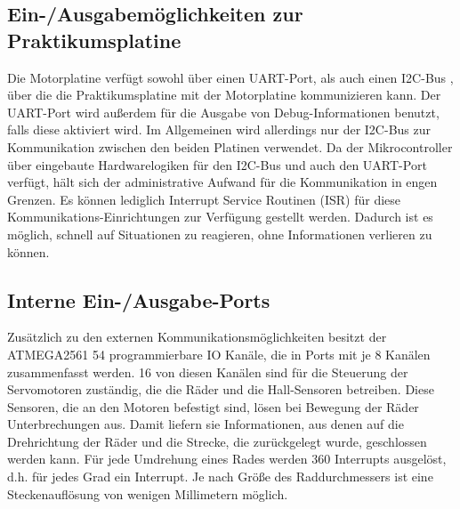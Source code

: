 \subsection{Ein-/Ausgabemöglichkeiten zur Praktikumsplatine}
Die Motorplatine verfügt sowohl über einen UART-Port, als auch einen I2C-Bus \cite{I2C_WIKI}, über die
die Praktikumsplatine mit der Motorplatine kommunizieren kann. Der UART-Port wird außerdem
für die Ausgabe von Debug-Informationen benutzt, falls diese aktiviert wird. Im Allgemeinen
wird allerdings nur der I2C-Bus zur Kommunikation zwischen den beiden Platinen verwendet.
Da der Mikrocontroller über eingebaute Hardwarelogiken für den I2C-Bus und auch
den UART-Port verfügt, hält sich der administrative Aufwand für die Kommunikation in engen
Grenzen. Es können lediglich Interrupt Service Routinen (ISR) für diese Kommunikations-Einrichtungen zur Verfügung gestellt
werden. Dadurch ist es möglich, schnell auf Situationen zu reagieren, ohne Informationen verlieren zu können.
\subsection{Interne Ein-/Ausgabe-Ports}
Zusätzlich zu den externen Kommunikationsmöglichkeiten besitzt der ATMEGA2561 54
programmierbare IO Kanäle, die in Ports mit je 8 Kanälen zusammenfasst werden. 16 von diesen
Kanälen sind für die Steuerung der Servomotoren zuständig, die die Räder und die Hall-Sensoren betreiben.
Diese Sensoren, die an den Motoren befestigt sind, lösen bei Bewegung der Räder Unterbrechungen aus.
Damit liefern sie Informationen, aus denen auf die Drehrichtung der Räder und die Strecke, die zurückgelegt wurde,
geschlossen werden kann.
Für jede Umdrehung eines Rades werden 360 Interrupts ausgelöst, d.h. für jedes Grad ein Interrupt. Je
nach Größe des Raddurchmessers ist eine Steckenauflösung von wenigen Millimetern möglich.
